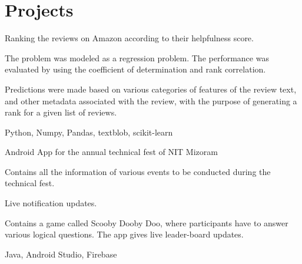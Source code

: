 
\section{Projects}

\begin{tightemize}
\item Ranking the reviews on Amazon according to their helpfulness score.
\item The problem was modeled as a regression problem. The performance was evaluated by using the coefficient of determination and rank correlation.
\item Predictions were made based on various categories of features of the review text, and other metadata associated with the review, with the purpose of generating a rank for a given list of reviews.
\item {} Python, Numpy, Pandas, textblob, scikit-learn
\end{tightemize}
\sectionsep

\begin{tightemize}\item Android App for the annual technical fest of NIT Mizoram
\item Contains all the information of various events to be conducted during the technical fest.
\item Live notification updates.
\item Contains a game called Scooby Dooby Doo, where participants have to answer various logical questions. The app gives live leader-board updates.
\item {} Java, Android Studio, Firebase
\end{tightemize}
\sectionsep